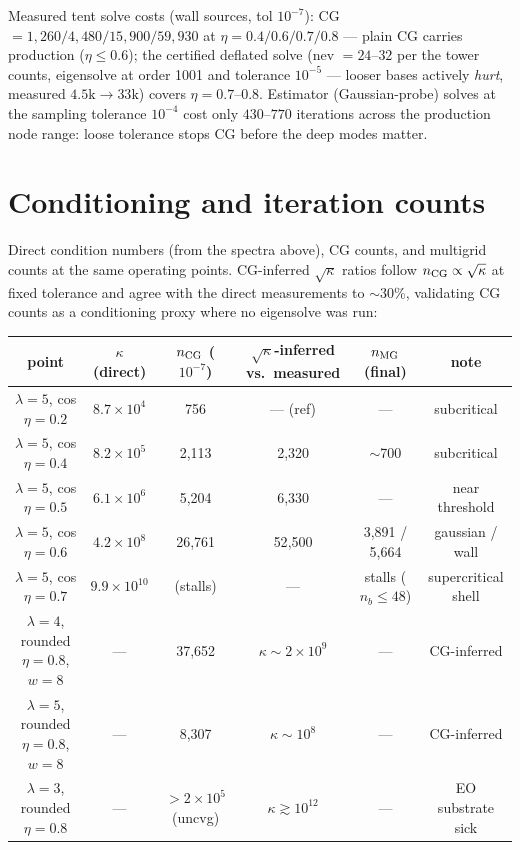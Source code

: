\documentclass[11pt]{article}
\begin{document}
Measured tent solve costs (wall sources, tol $10^{-7}$):
CG $= 1{,}260 / 4{,}480 / 15{,}900 / 59{,}930$ at
$\eta = 0.4/0.6/0.7/0.8$ --- plain CG carries production
($\eta \le 0.6$); the certified deflated solve
(nev $= 24$--$32$ per the tower counts, eigensolve at order 1001 and
tolerance $10^{-5}$ --- looser bases actively \emph{hurt}, measured
$4.5\mathrm{k} \to 33\mathrm{k}$) covers $\eta = 0.7$--$0.8$.
Estimator (Gaussian-probe) solves at the sampling tolerance $10^{-4}$
cost only $430$--$770$ iterations across the production node range:
loose tolerance stops CG before the deep modes matter.

\section{Conditioning and iteration counts}
\label{sec:iters}
Direct condition numbers (from the spectra above), CG counts, and
multigrid counts at the same operating points.  CG-inferred
$\sqrt{\kappa}$ ratios follow $n_{\rm CG}\propto\sqrt{\kappa}$ at fixed
tolerance and agree with the direct measurements to $\sim$30\%,
validating CG counts as a conditioning proxy where no eigensolve was
run:

\begin{center}
\begin{tabular}{cccccc}
\toprule
point & $\kappa$ (direct) & $n_{\rm CG}$ ($10^{-7}$) &
$\sqrt{\kappa}$-inferred vs.\ measured & $n_{\rm MG}$ (final) & note \\
\midrule
$\lambda{=}5$, cos $\eta{=}0.2$ & $8.7\times10^4$ & 756 & --- (ref) & --- & subcritical \\
$\lambda{=}5$, cos $\eta{=}0.4$ & $8.2\times10^5$ & 2{,}113 & 2{,}320 & $\sim$700\footnotemark & subcritical \\
$\lambda{=}5$, cos $\eta{=}0.5$ & $6.1\times10^6$ & 5{,}204 & 6{,}330 & --- & near threshold \\
$\lambda{=}5$, cos $\eta{=}0.6$ & $4.2\times10^8$ & 26{,}761 & 52{,}500 & 3{,}891 / 5{,}664 & gaussian / wall \\
$\lambda{=}5$, cos $\eta{=}0.7$ & $9.9\times10^{10}$ & (stalls) & --- & stalls ($n_b\le48$) & supercritical shell \\
$\lambda{=}4$, rounded $\eta{=}0.8$, $w{=}8$ & --- & 37{,}652 & $\kappa \sim 2\times10^{9}$ & --- & CG-inferred \\
$\lambda{=}5$, rounded $\eta{=}0.8$, $w{=}8$ & --- & 8{,}307 & $\kappa \sim 10^{8}$ & --- & CG-inferred \\
$\lambda{=}3$, rounded $\eta{=}0.8$ & --- & $>2\times10^5$ (uncvg) & $\kappa \gtrsim 10^{12}$ & --- & EO substrate sick \\
\bottomrule
\end{tabular}
\end{center}
\end{document}
